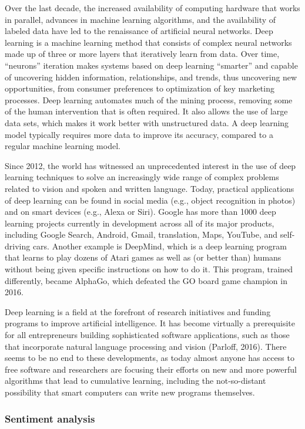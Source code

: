 \documentclass[
  letterpaper,
  DIV=11,
  numbers=noendperiod]{scrreprt}
\begin{document}
Over the last decade, the increased availability of computing hardware
that works in parallel, advances in machine learning algorithms, and the
availability of labeled data have led to the renaissance of artificial
neural networks. Deep learning is a machine learning method that
consists of complex neural networks made up of three or more layers that
iteratively learn from data. Over time, ``neurons'' iteration makes
systems based on deep learning ``smarter'' and capable of uncovering
hidden information, relationships, and trends, thus uncovering new
opportunities, from consumer preferences to optimization of key
marketing processes. Deep learning automates much of the mining process,
removing some of the human intervention that is often required. It also
allows the use of large data sets, which makes it work better with
unstructured data. A deep learning model typically requires more data to
improve its accuracy, compared to a regular machine learning model.

Since 2012, the world has witnessed an unprecedented interest in the use
of deep learning techniques to solve an increasingly wide range of
complex problems related to vision and spoken and written language.
Today, practical applications of deep learning can be found in social
media (e.g., object recognition in photos) and on smart devices (e.g.,
Alexa or Siri). Google has more than 1000 deep learning projects
currently in development across all of its major products, including
Google Search, Android, Gmail, translation, Maps, YouTube, and
self-driving cars. Another example is DeepMind, which is a deep learning
program that learns to play dozens of Atari games as well as (or better
than) humans without being given specific instructions on how to do it.
This program, trained differently, became AlphaGo, which defeated the GO
board game champion in 2016.

Deep learning is a field at the forefront of research initiatives and
funding programs to improve artificial intelligence. It has become
virtually a prerequisite for all entrepreneurs building sophisticated
software applications, such as those that incorporate natural language
processing and vision (Parloff, 2016). There seems to be no end to these
developments, as today almost anyone has access to free software and
researchers are focusing their efforts on new and more powerful
algorithms that lead to cumulative learning, including the
not-so-distant possibility that smart computers can write new programs
themselves.

\hypertarget{sentiment-analysis}{%
\subsubsection{Sentiment analysis}\label{sentiment-analysis}}
\end{document}
